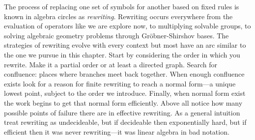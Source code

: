 The process of replacing one set of symbols for another based on fixed rules 
is known in algebra circles as \emph{rewriting}.  Rewriting 
occurs everywhere from the evaluation of operators like we are explore now, 
to multiplying solvable groups, to solving algebraic geometry problems through 
Gr\"obner-Shirshov bases.  The strategies of rewriting evolve with every context 
but most have an arc similar to the one we pursue in this chapter.  Start by 
considering the order in which you rewrite.  Make it a partial order or at 
least a directed graph.  Search for confluence: places where branches meet back
together.  When enough confluence exists look for a reason for finite rewriting 
to reach a normal form---a unique lowest point, subject to the order we introduce.
Finally, when normal form exist the work begins to get that normal form efficiently.
Above all notice how many possible points of failure there are in effective 
rewriting.  As a general intuition treat rewriting as undecideable, but if decideable 
then exponentially hard, but if efficient then it was never rewriting---it was 
linear algebra in bad notation. 